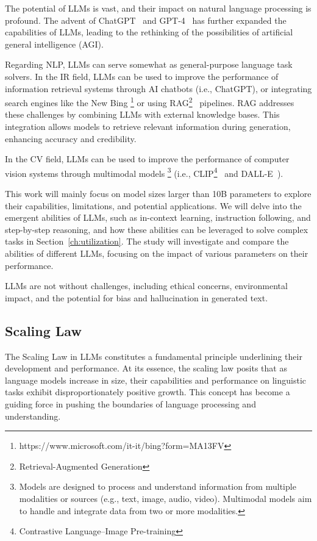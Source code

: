 The potential of LLMs is vast, and their impact on natural language processing is profound.
The advent of ChatGPT~\cite{adiwardana2020towards} and GPT-4~\cite{openai2024gpt4} has further expanded the capabilities of LLMs, leading to the rethinking of the possibilities of artificial general intelligence (AGI).

Regarding NLP, LLMs can serve somewhat as general-purpose language task solvers.
In the IR field, LLMs can be used to improve the performance of information retrieval systems through AI chatbots (i.e., ChatGPT), or integrating search engines like the New Bing \footnote{https://www.microsoft.com/it-it/bing?form=MA13FV} or using RAG\footnote{Retrieval-Augmented Generation}~\cite{gao2024retrievalaugmentedgenerationlargelanguage} pipelines.
RAG addresses these challenges by combining LLMs with external knowledge bases.
This integration allows models to retrieve relevant information during generation, enhancing accuracy and credibility.

In the CV field, LLMs can be used to improve the performance of computer vision systems through multimodal models \footnote{
	Models are designed to process and understand information from multiple modalities or sources (e.g., text, image, audio, video).
	Multimodal models aim to handle and integrate data from two or more modalities.
} (i.e., CLIP\footnote{Contrastive Language–Image Pre-training}~\cite{radford2021learning} and DALL-E~\cite{ramesh2021zero}).

This work will mainly focus on model sizes larger than 10B parameters to explore their capabilities, limitations, and potential applications.
We will delve into the emergent abilities of LLMs, such as in-context learning, instruction following, and step-by-step reasoning, and how these abilities can be leveraged to solve complex tasks in Section~\ref{ch:utilization}.
The study will investigate and compare the abilities of different LLMs, focusing on the impact of various parameters on their performance.

LLMs are not without challenges, including ethical concerns, environmental impact, and the potential for bias and hallucination in generated text.

\subsection{Scaling Law}
\label{subsec:scaling-law-in-large-language-models}

The Scaling Law in LLMs constitutes a fundamental principle underlining their development and performance.
At its essence, the scaling law posits that as language models increase in size, their capabilities and performance on linguistic tasks exhibit disproportionately positive growth.
This concept has become a guiding force in pushing the boundaries of language processing and understanding.

